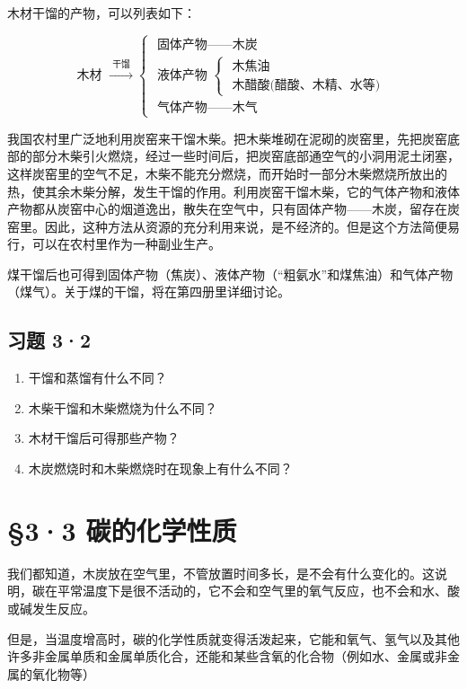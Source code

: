 木材干馏的产物，可以列表如下：

\[
\text{ 木材 } \xrightarrow {\text{ 干馏 }} \left\{ \begin{array}{ll} \text{ 固体产物——木炭 } \\ \text{ 液体产物 } \left\{ \begin{array}{ll} \text{ 木焦油 } \\ \text{ 木醋酸(醋酸、木精、水等) } \end{array} \right. \\ \text{ 气体产物——木气 } \end{array} \right.
\]

我国农村里广泛地利用炭窑来干馏木柴。把木柴堆砌在泥砌的炭窑里，先把炭窑底部的部分木柴引火燃烧，经过一些时间后，把炭窑底部通空气的小洞用泥土闭塞，这样炭窑里的空气不足，木柴不能充分燃烧，而开始时一部分木柴燃烧所放出的热，使其余木柴分解，发生干馏的作用。利用炭窑干馏木柴，它的气体产物和液体产物都从炭窑中心的烟道逸出，散失在空气中，只有固体产物------木炭，留存在炭窑里。因此，这种方法从资源的充分利用来说，是不经济的。但是这个方法简便易行，可以在农村里作为一种副业生产。

煤干馏后也可得到固体产物（焦炭）、液体产物（``粗氨水''和煤焦油）和气体产物（煤气）。关于煤的干馏，将在第四册里详细讨论。

\subsection{习题 3·2}

\begin{enumerate}
\item
  干馏和蒸馏有什么不同？
\item
  木柴干馏和木柴燃烧为什么不同？
\item
  木材干馏后可得那些产物？
\item
  木炭燃烧时和木柴燃烧时在现象上有什么不同？
\end{enumerate}

\section{§3·3 碳的化学性质}

我们都知道，木炭放在空气里，不管放置时间多长，是不会有什么变化的。这说明，碳在平常温度下是很不活动的，它不会和空气里的氧气反应，也不会和水、酸或碱发生反应。

但是，当温度增高时，碳的化学性质就变得活泼起来，它能和氧气、氢气以及其他许多非金属单质和金属单质化合，还能和某些含氧的化合物（例如水、金属或非金属的氧化物等）

